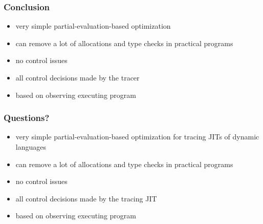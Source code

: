 \documentclass[utf8x]{beamer}
\begin{document}
\begin{frame}
  \frametitle{Conclusion}
  \begin{itemize}
      \item very simple partial-evaluation-based optimization
      \item can remove a lot of allocations and type checks in practical programs
      \item no control issues
      \item all control decisions made by the tracer
      \item based on observing executing program
  \end{itemize}
\end{frame}

\begin{frame}
  \frametitle{Questions?}
  \begin{itemize}
      \item very simple partial-evaluation-based optimization for tracing JITs of dynamic languages
      \item can remove a lot of allocations and type checks in practical programs
      \item no control issues
      \item all control decisions made by the tracing JIT
      \item based on observing executing program
  \end{itemize}
\end{frame}
\end{document}
